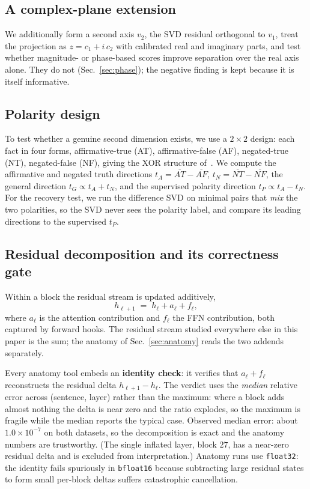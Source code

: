 \documentclass[11pt]{article}
\begin{document}
\subsection{A complex-plane extension}
\label{sec:complexmethod}

We additionally form a second axis $v_2$, the SVD residual orthogonal to
$v_1$, treat the projection as $z = c_1 + i\,c_2$ with calibrated real and
imaginary parts, and test whether magnitude- or phase-based scores improve
separation over the real axis alone. They do not (Sec.~\ref{sec:phase}); the
negative finding is kept because it is itself informative.

\subsection{Polarity design}
\label{sec:poldesign}

To test whether a genuine second dimension exists, we use a $2{\times}2$
design: each fact in four forms, affirmative-true (AT), affirmative-false
(AF), negated-true (NT), negated-false (NF), giving the XOR structure
of~\cite{burger2024}. We compute the affirmative and negated truth directions
$t_A = \overline{AT} - \overline{AF}$, $t_N = \overline{NT} - \overline{NF}$,
the general direction $t_G \propto t_A + t_N$, and the supervised polarity
direction $t_P \propto t_A - t_N$. For the recovery test, we run the
difference SVD on minimal pairs that \emph{mix} the two polarities, so the
SVD never sees the polarity label, and compare its leading directions to the
supervised $t_P$.

\subsection{Residual decomposition and its correctness gate}
\label{sec:decomp}

Within a block the residual stream is updated additively,
\begin{equation}
h_{\ell+1} \;=\; h_{\ell} + a_{\ell} + f_{\ell},
\end{equation}
where $a_{\ell}$ is the attention contribution and $f_{\ell}$ the FFN
contribution, both captured by forward hooks. The residual stream studied
everywhere else in this paper is the sum; the anatomy of
Sec.~\ref{sec:anatomy} reads the two addends separately.

Every anatomy tool embeds an \textbf{identity check}: it verifies that
$a_{\ell} + f_{\ell}$ reconstructs the residual delta $h_{\ell+1} - h_{\ell}$.
The verdict uses the \emph{median} relative error across (sentence, layer)
rather than the maximum: where a block adds almost nothing the delta is near
zero and the ratio explodes, so the maximum is fragile while the median
reports the typical case. Observed median error: about $1.0 \times 10^{-7}$
on both datasets, so the decomposition is exact and the anatomy numbers are
trustworthy. (The single inflated layer, block $27$, has a near-zero residual
delta and is excluded from interpretation.) Anatomy runs use
\texttt{float32}: the identity fails spuriously in \texttt{bfloat16} because
subtracting large residual states to form small per-block deltas suffers
catastrophic cancellation.
\end{document}
